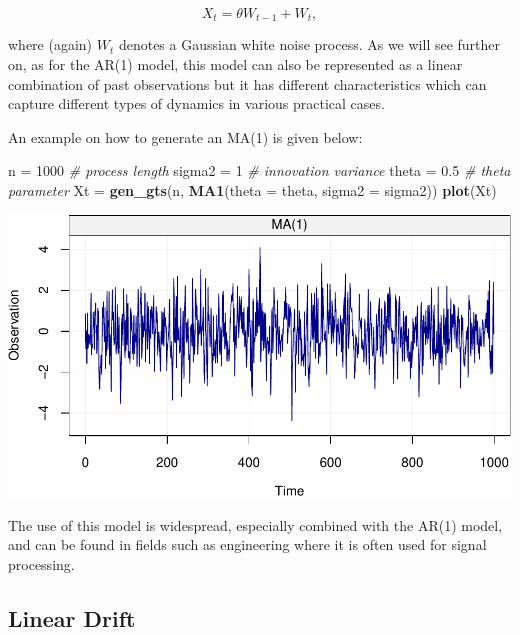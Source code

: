\documentclass[]{book}
\newenvironment{Shaded}{\begin{snugshade}}{\end{snugshade}}
\newcommand{\CommentTok}[1]{\textcolor[rgb]{0.56,0.35,0.01}{\textit{#1}}}
\newcommand{\DataTypeTok}[1]{\textcolor[rgb]{0.13,0.29,0.53}{#1}}
\newcommand{\DecValTok}[1]{\textcolor[rgb]{0.00,0.00,0.81}{#1}}
\newcommand{\FloatTok}[1]{\textcolor[rgb]{0.00,0.00,0.81}{#1}}
\newcommand{\KeywordTok}[1]{\textcolor[rgb]{0.13,0.29,0.53}{\textbf{#1}}}
\newcommand{\NormalTok}[1]{#1}
\newcommand{\StringTok}[1]{\textcolor[rgb]{0.31,0.60,0.02}{#1}}
\theoremstyle{definition}
\theoremstyle{definition}
\theoremstyle{definition}
\theoremstyle{remark}
\begin{document}
\begin{equation} 
  X_t = \theta W_{t-1} + W_t,
\end{equation}

where (again) \(W_t\) denotes a Gaussian white noise process. As we will
see further on, as for the AR(1) model, this model can also be
represented as a linear combination of past observations but it has
different characteristics which can capture different types of dynamics
in various practical cases.

An example on how to generate an MA(1) is given below:

\begin{Shaded}
\begin{Highlighting}[]
\NormalTok{n =}\StringTok{ }\DecValTok{1000}                              \CommentTok{# process length}
\NormalTok{sigma2 =}\StringTok{ }\DecValTok{1}                            \CommentTok{# innovation variance}
\NormalTok{theta =}\StringTok{ }\FloatTok{0.5}                           \CommentTok{# theta parameter}
\NormalTok{Xt =}\StringTok{ }\KeywordTok{gen_gts}\NormalTok{(n, }\KeywordTok{MA1}\NormalTok{(}\DataTypeTok{theta =}\NormalTok{ theta, }\DataTypeTok{sigma2 =}\NormalTok{ sigma2))}
\KeywordTok{plot}\NormalTok{(Xt)}
\end{Highlighting}
\end{Shaded}

\includegraphics{ts_files/figure-latex/example_MA1-1.pdf}

The use of this model is widespread, especially combined with the AR(1)
model, and can be found in fields such as engineering where it is often
used for signal processing.

\hypertarget{drift}{%
\subsection{Linear Drift}\label{drift}}
\end{document}
